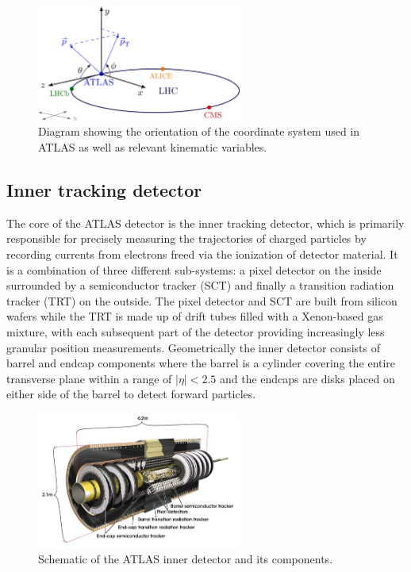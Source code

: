 \begin{figure}
\centering
    \includegraphics[width=0.6\textwidth]{images/ATLAS_Coordinate_System.png}
    \caption{Diagram showing the orientation of the coordinate system used in ATLAS as well as relevant kinematic 
    variables.}
    \label{fig:ATLAS_Coordinate_System}
\end{figure}

\subsection{Inner tracking detector}
The core of the ATLAS detector is the inner tracking detector, which is primarily responsible for precisely measuring 
the trajectories of charged particles by recording currents from electrons freed via the ionization of detector 
material. It is a combination of three different sub-systems: a pixel detector on the inside surrounded by a 
semiconductor tracker (SCT) and finally a transition radiation tracker (TRT) on the outside. The pixel detector and 
SCT are built from silicon wafers while the TRT is made up of drift tubes filled with a Xenon-based gas mixture, with 
each subsequent part of the detector providing increasingly less granular position measurements. Geometrically the 
inner detector consists of barrel and endcap components where the barrel is a cylinder covering the entire transverse 
plane within a range of $|\eta| < 2.5$ and the endcaps are disks placed on either side of the barrel to detect 
forward particles. \par

\begin{figure}
\centering
    \includegraphics[width=0.6\textwidth]{images/ATLAS_Inner_Detector.jpg}
    \caption{Schematic of the ATLAS inner detector and its components.}
    \label{fig:ATLAS_Inner_Detector}
\end{figure}

